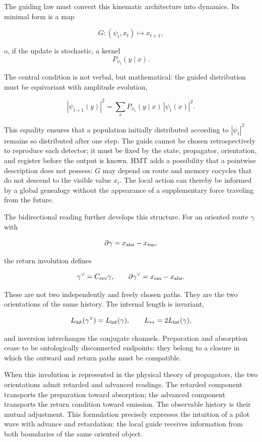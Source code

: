 The guiding law must convert this kinematic architecture into dynamics. Its
minimal form is a map

\[
  G:(\psi_t,x_t)\longmapsto x_{t+1},
\]

o, if the update is stochastic, a kernel
\[
  P_{\psi_t}(y\mid x).
\]

The central condition is not verbal, but mathematical: the guided distribution must be
equivariant with amplitude evolution,

\[
  |\psi_{t+1}(y)|^2
  =
  \sum_x P_{\psi_t}(y\mid x)\,|\psi_t(x)|^2.
\]

This equality ensures that a population initially distributed according to
\(|\psi_t|^2\) remains so distributed after one step. The guide cannot be
chosen retrospectively to reproduce each detector; it must be fixed by
the state, propagator, orientation, and register before the output is known.
HMT adds a possibility that a pointwise description does not possess: \(G\) may
depend on route and memory cocycles that do not descend to the visible value
\(x_t\). The local action can thereby be informed by a global genealogy without
the appearance of a supplementary force traveling from the future.

The bidirectional reading further develops this structure. For an oriented route
\(\gamma\) with

\[
  \partial\gamma=x_{\rm abs}-x_{\rm em},
\]

the return involution defines

\[
  \gamma^\vee=C_{\rm rev}\gamma,
  \qquad
  \partial\gamma^\vee=x_{\rm em}-x_{\rm abs}.
\]

These are not two independently and freely chosen paths. They are the two
orientations of the same history. The internal length is invariant,

\[
  L_{\rm int}(\gamma^\vee)=L_{\rm int}(\gamma),
  \qquad
  L_{\leftrightarrow}=2L_{\rm int}(\gamma),
\]

and inversion interchanges the conjugate channels. Preparation and absorption
cease to be ontologically disconnected endpoints: they belong to a closure in
which the outward and return paths must be compatible.

When this involution is represented in the physical theory of propagators, the two orientations admit retarded and advanced readings. The retarded component transports the preparation toward absorption; the advanced component transports the return condition toward emission. The observable history is their mutual adjustment. This formulation precisely expresses the intuition of a pilot wave with advance and retardation: the local guide receives information from both boundaries of the same oriented object.


